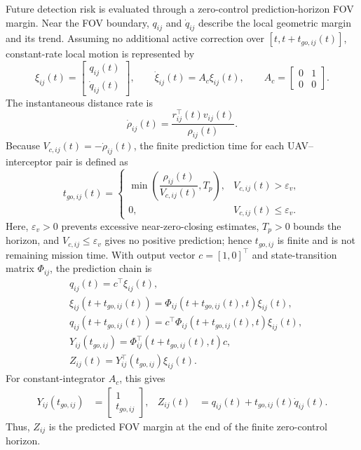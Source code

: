 \documentclass{cja}
\begin{document}
Future detection risk is evaluated through a zero-control prediction-horizon FOV margin. Near the FOV boundary, $q_{ij}$ and $\dot q_{ij}$ describe the local geometric margin and its trend. Assuming no additional active correction over $[t,t+t_{go,ij}(t)]$, constant-rate local motion is represented by
\begin{equation}
\xi_{ij}(t)=
\begin{bmatrix}
q_{ij}(t)\\
\dot q_{ij}(t)
\end{bmatrix},
\qquad
\dot \xi_{ij}(t)=A_c\xi_{ij}(t),
\qquad
A_c=
\begin{bmatrix}
0&1\\
0&0
\end{bmatrix}.
\end{equation}
The instantaneous distance rate is
\begin{equation}
\dot\rho_{ij}(t)
=
\frac{r_{ij}^{\top}(t)v_{ij}(t)}{\rho_{ij}(t)}.
\end{equation}
Because $V_{c,ij}(t)=-\dot\rho_{ij}(t)$, the finite prediction time for each UAV--interceptor pair is defined as
\begin{equation}
t_{go,ij}(t)
=
\begin{cases}
\displaystyle
\min\!\left(
\dfrac{\rho_{ij}(t)}{V_{c,ij}(t)},
T_p
\right),
& V_{c,ij}(t)>\varepsilon_v,\\[3mm]
0,
& V_{c,ij}(t)\le\varepsilon_v.
\end{cases}
\end{equation}
Here, $\varepsilon_v>0$ prevents excessive near-zero-closing estimates, $T_p>0$ bounds the horizon, and $V_{c,ij}\le\varepsilon_v$ gives no positive prediction; hence $t_{go,ij}$ is finite and is not remaining mission time. With output vector $c=[1,0]^\top$ and state-transition matrix $\Phi_{ij}$, the prediction chain is
\begin{equation}
\begin{aligned}
&q_{ij}(t)=c^\top\xi_{ij}(t),\\
&\xi_{ij}\!\left(t+t_{go,ij}(t)\right)
=\Phi_{ij}\!\left(t+t_{go,ij}(t),t\right)\xi_{ij}(t),\\
&q_{ij}\!\left(t+t_{go,ij}(t)\right)
=c^\top\Phi_{ij}\!\left(t+t_{go,ij}(t),t\right)\xi_{ij}(t),\\
&Y_{ij}(t_{go,ij})
=\Phi_{ij}^{\top}\!\left(t+t_{go,ij}(t),t\right)c,\\
&Z_{ij}(t)=Y_{ij}^{\top}(t_{go,ij})\xi_{ij}(t).
\end{aligned}
\end{equation}
For constant-integrator $A_c$, this gives
\begin{equation}
\begin{aligned}
Y_{ij}(t_{go,ij})
&=
\begin{bmatrix}
1\\
t_{go,ij}
\end{bmatrix},&
Z_{ij}(t)
&=q_{ij}(t)+t_{go,ij}(t)\dot q_{ij}(t).
\end{aligned}
\end{equation}
Thus, $Z_{ij}$ is the predicted FOV margin at the end of the finite zero-control horizon.
\end{document}
